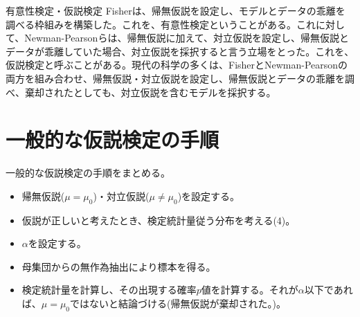\begin{SMbox}{有意性検定・仮説検定}
    Fisherは、帰無仮説を設定し、モデルとデータの乖離を調べる枠組みを構築した。これを、有意性検定ということがある。これに対して、Newman-Pearsonらは、帰無仮説に加えて、対立仮説を設定し、帰無仮説とデータが乖離していた場合、対立仮説を採択すると言う立場をとった。これを、仮説検定と呼ぶことがある。現代の科学の多くは、FisherとNewman-Pearsonの両方を組み合わせ、帰無仮説・対立仮説を設定し、帰無仮説とデータの乖離を調べ、棄却されたとしても、対立仮説を含むモデルを採択する。
\end{SMbox}
    
\section{一般的な仮説検定の手順}
一般的な仮説検定の手順をまとめる。
%
\begin{framed}
    \begin{itemize}
        \item 帰無仮説($\mu = \mu_0$)・対立仮説($\mu\neq \mu_0$)を設定する。
        \item 仮説が正しいと考えたとき、検定統計量従う分布を考える(4)。
        \item $\alpha$を設定する。
        \item 母集団からの無作為抽出により標本を得る。
        \item 検定統計量を計算し、その出現する確率$p$値を計算する。それが$\alpha$以下であれば、$\mu=\mu_0$ではないと結論づける(帰無仮説が棄却された。)。%
    \end{itemize}
\end{framed}
\fi


